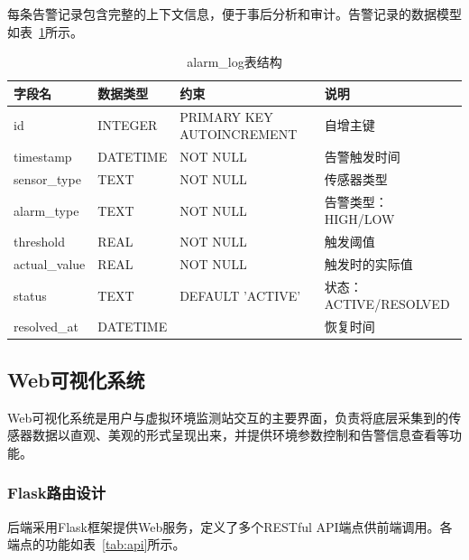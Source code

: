 \documentclass[12pt,a4paper]{ctexart}
\begin{document}
每条告警记录包含完整的上下文信息，便于事后分析和审计。告警记录的数据模型如表~\ref{tab:alarm_log}所示。

\begin{table}[H]
    \centering
    \caption{alarm\_log表结构}
    \label{tab:alarm_log}
    \begin{tabular}{@{}lllp{5cm}@{}}
        \toprule
        \textbf{字段名} & \textbf{数据类型} & \textbf{约束} & \textbf{说明} \\
        \midrule
        id & INTEGER & PRIMARY KEY AUTOINCREMENT & 自增主键 \\
        timestamp & DATETIME & NOT NULL & 告警触发时间 \\
        sensor\_type & TEXT & NOT NULL & 传感器类型 \\
        alarm\_type & TEXT & NOT NULL & 告警类型：HIGH/LOW \\
        threshold & REAL & NOT NULL & 触发阈值 \\
        actual\_value & REAL & NOT NULL & 触发时的实际值 \\
        status & TEXT & DEFAULT 'ACTIVE' & 状态：ACTIVE/RESOLVED \\
        resolved\_at & DATETIME & & 恢复时间 \\
        \bottomrule
    \end{tabular}
\end{table}

\subsection{Web可视化系统}

Web可视化系统是用户与虚拟环境监测站交互的主要界面，负责将底层采集到的传感器数据以直观、美观的形式呈现出来，并提供环境参数控制和告警信息查看等功能。

\subsubsection{Flask路由设计}

后端采用Flask框架提供Web服务，定义了多个RESTful API端点供前端调用。各端点的功能如表~\ref{tab:api}所示。
\end{document}
